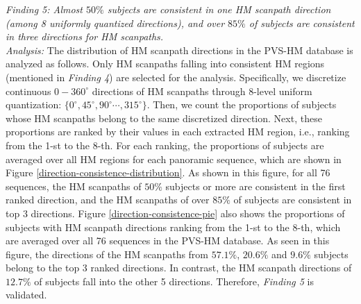 \documentclass[10pt,journal,compsoc]{IEEEtran}
\begin{document}
\emph{Finding 5: Almost $50\%$ subjects are consistent in one HM scanpath direction (among 8 uniformly quantized directions), and over $85\%$ of subjects are consistent in three directions for HM scanpaths. }
\\ \textit{Analysis:} The distribution of HM scanpath directions in the PVS-HM database is analyzed as follows.
Only HM scanpaths falling into consistent HM regions (mentioned in \textit{Finding 4}) are selected for the analysis.
Specifically, we discretize continuous $0-360^{\circ}$ directions of HM scanpaths through 8-level uniform quantization: $\{0^{\circ}, 45^{\circ}, 90^{\circ} \cdots, 315^{\circ} \}$.
Then, we count the proportions of subjects whose HM scanpaths belong to the same discretized direction. Next, these proportions are ranked by their values in each extracted HM region, i.e., ranking from the 1-st to the 8-th. For each ranking, the proportions of subjects are averaged over all HM regions for each panoramic sequence, which are shown in Figure \ref{direction-consistence-distribution}.
As shown in this figure, for all 76 sequences, the HM scanpaths of $50\%$ subjects or more are consistent in the first ranked direction, and the HM scanpaths of over $85\%$ of subjects are consistent in top 3 directions. Figure \ref{direction-consistence-pie} also shows the proportions of subjects with HM scanpath directions ranking from the 1-st to the 8-th, which are averaged over all 76 sequences in the PVS-HM database.
As seen in this figure, the directions of the HM scanpaths from $57.1\%$, $20.6\%$ and $9.6\%$ subjects belong to the top 3 ranked directions. In contrast, the HM scanpath directions of $12.7\%$ of subjects fall into the other 5 directions. Therefore, \textit{Finding 5} is validated.




\end{document}
